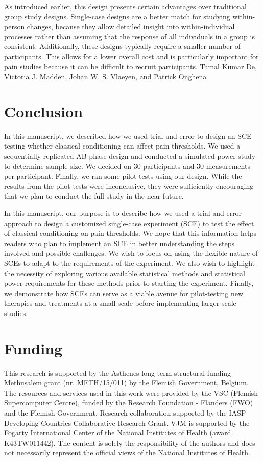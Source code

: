 \documentclass[empirical,issue, twocolumn,authordate]{jote-new-article}
\begin{document}
As introduced earlier, this design presents certain advantages over traditional group study designs. Single-case designs are a better match for studying within-person changes, because they allow detailed insight into within-individual processes rather than assuming that the response of all individuals in a group is consistent. Additionally, these designs typically require a smaller number of participants. This allows for a lower overall cost and is particularly important for pain studies because it can be difficult to recruit participants.
Tamal Kumar De, Victoria J. Madden, Johan W. S. Vlaeyen, and Patrick Onghena

\section{Conclusion}

In this manuscript, we described how we used trial and error to design an SCE testing whether classical conditioning can affect pain thresholds. We used a sequentially replicated AB phase design and conducted a simulated power study to determine sample size. We decided on 30 participants and 30 measurements per participant. Finally, we ran some pilot tests using our design. While the results from the pilot tests were inconclusive, they were sufficiently encouraging that we plan to conduct the full study in the near future.

\begin{originalPurpose}

In this manuscript, our purpose is to describe how we used a trial and error approach to design a customized single-case experiment (SCE) to test the effect of classical conditioning on pain thresholds. We hope that this information helps readers who plan to implement an SCE in better understanding the steps involved and possible challenges. We wish to focus on using the flexible nature of SCEs to adapt to the requirements of the experiment. We also wish to highlight the necessity of exploring various available statistical methods and statistical power requirements for these methods prior to starting the experiment. Finally, we demonstrate how SCEs can serve as a viable avenue for pilot-testing new therapies and treatments at a small scale before implementing larger scale studies.
\end{originalPurpose}
\section{Funding}
This research is supported by the Asthenes long-term structural funding - Methusalem grant (nr. METH/15/011) by the Flemish Government, Belgium. The resources and services used in this work were provided by the VSC (Flemish Supercomputer Centre), funded by the Research Foundation - Flanders (FWO) and the Flemish Government. Research collaboration supported by the IASP Developing Countries Collaborative Research Grant. VJM is supported by the Fogarty International Center of the National Institutes of Health (award K43TW011442). The content is solely the responsibility of the authors and does not necessarily represent the official views of the National Institutes of Health.
\end{document}
